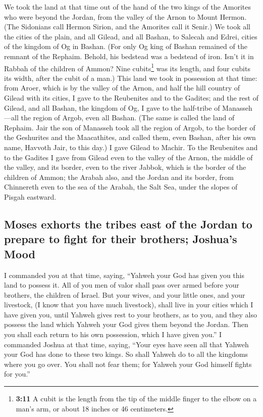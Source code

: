  We took the land at that time out of the hand of the two
kings of the Amorites who were beyond the Jordan, from the valley of the
Arnon to Mount Hermon.  (The Sidonians call Hermon Sirion,
and the Amorites call it Senir.)  We took all the cities
of the plain, and all Gilead, and all Bashan, to Salecah and Edrei,
cities of the kingdom of Og in Bashan.  (For only Og king
of Bashan remained of the remnant of the Rephaim. Behold, his bedstead
was a bedstead of iron. Isn't it in Rabbah of the children of Ammon?
Nine cubits\footnote{\textbf{3:11} A cubit is the length from the tip of
  the middle finger to the elbow on a man's arm, or about 18 inches or
  46 centimeters.} was its length, and four cubits its width, after the
cubit of a man.)  This land we took in possession at that
time: from Aroer, which is by the valley of the Arnon, and half the hill
country of Gilead with its cities, I gave to the Reubenites and to the
Gadites;  and the rest of Gilead, and all Bashan, the
kingdom of Og, I gave to the half-tribe of Manasseh---all the region of
Argob, even all Bashan. (The same is called the land of Rephaim.
 Jair the son of Manasseh took all the region of Argob,
to the border of the Geshurites and the Maacathites, and called them,
even Bashan, after his own name, Havvoth Jair, to this day.)
 I gave Gilead to Machir.  To the
Reubenites and to the Gadites I gave from Gilead even to the valley of
the Arnon, the middle of the valley, and its border, even to the river
Jabbok, which is the border of the children of Ammon; 
the Arabah also, and the Jordan and its border, from Chinnereth even to
the sea of the Arabah, the Salt Sea, under the slopes of Pisgah
eastward.

\hypertarget{moses-exhorts-the-tribes-east-of-the-jordan-to-prepare-to-fight-for-their-brothers-joshuas-mood}{%
\subsection{Moses exhorts the tribes east of the Jordan to prepare to
fight for their brothers; Joshua's
Mood}\label{moses-exhorts-the-tribes-east-of-the-jordan-to-prepare-to-fight-for-their-brothers-joshuas-mood}}

 I commanded you at that time, saying, ``Yahweh your God
has given you this land to possess it. All of you men of valor shall
pass over armed before your brothers, the children of Israel.
 But your wives, and your little ones, and your
livestock, (I know that you have much livestock), shall live in your
cities which I have given you,  until Yahweh gives rest
to your brothers, as to you, and they also possess the land which Yahweh
your God gives them beyond the Jordan. Then you shall each return to his
own possession, which I have given you.''  I commanded
Joshua at that time, saying, ``Your eyes have seen all that Yahweh your
God has done to these two kings. So shall Yahweh do to all the kingdoms
where you go over.  You shall not fear them; for Yahweh
your God himself fights for you.''

